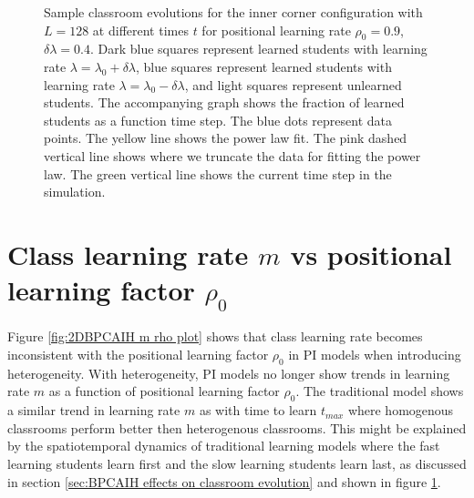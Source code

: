 \begin{figure}[htbp!]
   \caption{Sample classroom evolutions for the inner corner configuration with $L=128$ at different times $t$ for positional learning rate $\rho_0=0.9$, $\delta\lambda = 0.4$.
   Dark blue squares represent learned students with learning rate $\lambda = \lambda_0 + \delta\lambda$, blue squares represent learned students with learning rate $\lambda = \lambda_0 - \delta\lambda$, and light squares represent unlearned students.
   The accompanying graph shows the fraction of learned students as a function time step.
   The blue dots represent data points. 
   The yellow line shows the power law fit.
   The pink dashed vertical line shows where we truncate the data for fitting the power law.
   The green vertical line shows the current time step in the simulation.
   }
   \label{fig:2DBPCAIH sample class evolution trad low rho high delta}
\end{figure}

\newpage %

\section{Class learning rate $m$ vs positional learning factor $\rho_0$}\label{sec:BPCAIH m vs rho}

Figure \ref{fig:2DBPCAIH m rho plot} shows that class learning rate becomes inconsistent with the positional learning factor $\rho_0$ in PI models when introducing heterogeneity. 
With heterogeneity, PI models no longer show trends in learning rate $m$ as a function of positional learning factor $\rho_0$.
The traditional model shows a similar trend in learning rate $m$ as with time to learn $t_{max}$ where homogenous classrooms perform better then heterogenous classrooms.
This might be explained by the spatiotemporal dynamics of traditional learning models where the fast learning students learn first and the slow learning students learn last, as discussed in section \ref{sec:BPCAIH effects on classroom evolution} and shown in figure \ref{fig:2DBPCAIH sample class evolution trad low rho high delta}.

